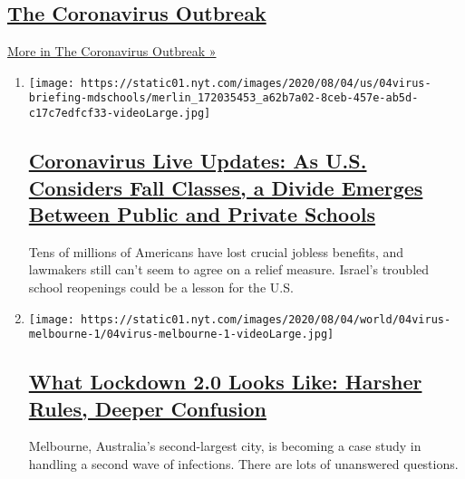 \hypertarget{the-coronavirus-outbreak}{%
\subsection{\texorpdfstring{\href{/news-event/coronavirus}{The
Coronavirus
Outbreak}}{The Coronavirus Outbreak}}\label{the-coronavirus-outbreak}}

\href{/news-event/coronavirus}{More in The Coronavirus Outbreak »}

\begin{enumerate}
\def\labelenumi{\arabic{enumi}.}
\item
  \texttt{[image: https://static01.nyt.com/images/2020/08/04/us/04virus-briefing-mdschools/merlin\_172035453\_a62b7a02-8ceb-457e-ab5d-c17c7edfcf33-videoLarge.jpg]}

  \hypertarget{coronavirus-live-updates-as-us-considers-fall-classes-a-divide-emerges-between-public-and-private-schools-1}{%
  \subsection{\texorpdfstring{\href{/2020/08/04/world/coronavirus-cases.html}{Coronavirus
  Live Updates: As U.S. Considers Fall Classes, a Divide Emerges Between
  Public and Private
  Schools}}{Coronavirus Live Updates: As U.S. Considers Fall Classes, a Divide Emerges Between Public and Private Schools}}\label{coronavirus-live-updates-as-us-considers-fall-classes-a-divide-emerges-between-public-and-private-schools-1}}

  Tens of millions of Americans have lost crucial jobless benefits, and
  lawmakers still can't seem to agree on a relief measure. Israel's
  troubled school reopenings could be a lesson for the U.S.
\item
  \texttt{[image: https://static01.nyt.com/images/2020/08/04/world/04virus-melbourne-1/04virus-melbourne-1-videoLarge.jpg]}

  \hypertarget{what-lockdown-20-looks-like-harsher-rules-deeper-confusion-1}{%
  \subsection{\texorpdfstring{\href{/2020/08/04/world/australia/coronavirus-melbourne-lockdown.html}{What
  Lockdown 2.0 Looks Like: Harsher Rules, Deeper
  Confusion}}{What Lockdown 2.0 Looks Like: Harsher Rules, Deeper Confusion}}\label{what-lockdown-20-looks-like-harsher-rules-deeper-confusion-1}}

  Melbourne, Australia's second-largest city, is becoming a case study
  in handling a second wave of infections. There are lots of unanswered
  questions.


\end{enumerate}
